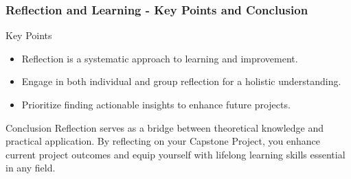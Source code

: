 \documentclass[aspectratio=169]{beamer}
\begin{document}
\begin{frame}[fragile]
    \frametitle{Reflection and Learning - Key Points and Conclusion}
    \begin{block}{Key Points}
        \begin{itemize}
            \item Reflection is a systematic approach to learning and improvement.
            \item Engage in both individual and group reflection for a holistic understanding.
            \item Prioritize finding actionable insights to enhance future projects.
        \end{itemize}
    \end{block}

    \begin{block}{Conclusion}
        Reflection serves as a bridge between theoretical knowledge and practical application. By reflecting on your Capstone Project, you enhance current project outcomes and equip yourself with lifelong learning skills essential in any field.
    \end{block}
\end{frame}
\end{document}
